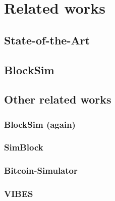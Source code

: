 \section{Related works}\label{sec:related}

\subsection{State-of-the-Art}\label{subsec:state-of-the-art}

\subsection{BlockSim}\label{subsec:blocksim}

\subsection{Other related works}\label{subsec:other-related}

\subsubsection{BlockSim (again)}\label{subsubsec:blocksimfaria}

\subsubsection{SimBlock}\label{subsubsec:simblock}

\subsubsection{Bitcoin-Simulator}\label{subsubsec:bitcoin-simulator}

\subsubsection{VIBES}\label{subsubsec:vibes}
